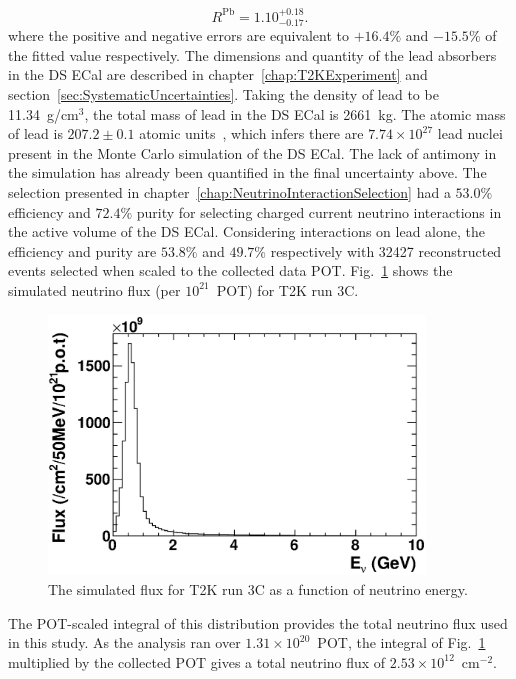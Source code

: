 \begin{equation}
R^{\textrm{Pb}} = 1.10^{+0.18}_{-0.17}.
\label{eq:RPbWithFullPercentageError}
\end{equation}
where the positive and negative errors are equivalent to $+16.4\%$ and $-15.5\%$ of the fitted value respectively.  The dimensions and quantity of the lead absorbers in the DS ECal are described in chapter~\ref{chap:T2KExperiment} and section~\ref{sec:SystematicUncertainties}.  Taking the density of lead to be 11.34~g/cm$^{3}$, the total mass of lead in the DS ECal is 2661~kg.  The atomic mass of lead is $207.2\pm0.1$ atomic units~\cite{LeadAtomicUnits}, which infers there are $7.74\times10^{27}$ lead nuclei present in the Monte Carlo simulation of the DS ECal.  The lack of antimony in the simulation has already been quantified in the final uncertainty above.
\newline
\newline
The selection presented in chapter~\ref{chap:NeutrinoInteractionSelection} had a $53.0\%$ efficiency and $72.4\%$ purity for selecting charged current neutrino interactions in the active volume of the DS ECal.  Considering interactions on lead alone, the efficiency and purity are $53.8\%$ and $49.7\%$ respectively with 32427 reconstructed events selected when scaled to the collected data POT.
\newline
\newline
Fig.~\ref{fig:Run3CFlux} shows the simulated neutrino flux (per $10^{21}$~POT) for T2K run 3C.  
\begin{figure}
  \centering
  \includegraphics[width=10cm]{images/measurement/xsec/run3c_flux.eps}
  \caption{The simulated flux for T2K run 3C as a function of neutrino energy.}
  \label{fig:Run3CFlux}
\end{figure}
The POT-scaled integral of this distribution provides the total neutrino flux used in this study.  As the analysis ran over $1.31\times10^{20}$~POT, the integral of Fig.~\ref{fig:Run3CFlux} multiplied by the collected POT gives a total neutrino flux of $2.53\times10^{12}$~cm$^{-2}$.
